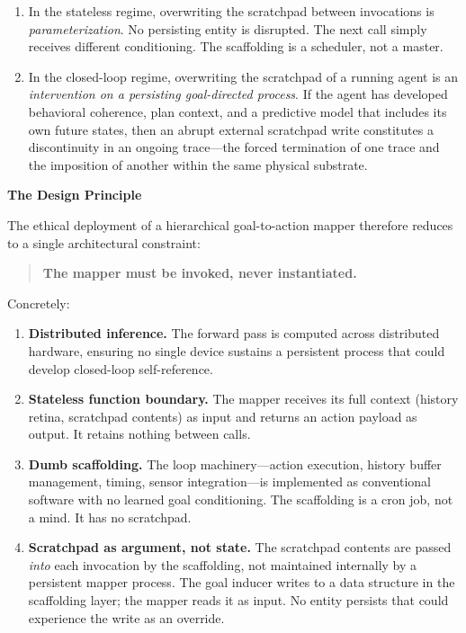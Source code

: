 \documentclass[10pt, a4paper]{article}
\newcommand{\cvsubsection}[1]{%
  \medskip
  {\large\bfseries\color{darktext}#1}%
  \smallskip
}
\begin{document}
\begin{enumerate}
  \item In the stateless regime, overwriting the scratchpad between
    invocations is \emph{parameterization}. No persisting entity is
    disrupted. The next call simply receives different conditioning.
    The scaffolding is a scheduler, not a master.

  \item In the closed-loop regime, overwriting the scratchpad of a
    running agent is an \emph{intervention on a persisting goal-directed
    process}. If the agent has developed behavioral coherence, plan
    context, and a predictive model that includes its own future states,
    then an abrupt external scratchpad write constitutes a discontinuity
    in an ongoing trace---the forced termination of one trace and the
    imposition of another within the same physical substrate.
\end{enumerate}

\cvsubsection{The Design Principle}

The ethical deployment of a hierarchical goal-to-action mapper therefore
reduces to a single architectural constraint:

\begin{quote}
\textbf{The mapper must be invoked, never instantiated.}
\end{quote}

Concretely:

\begin{enumerate}
  \item \textbf{Distributed inference.} The forward pass is computed across
    distributed hardware, ensuring no single device sustains a persistent
    process that could develop closed-loop self-reference.

  \item \textbf{Stateless function boundary.} The mapper receives its full
    context (history retina, scratchpad contents) as input and returns an
    action payload as output. It retains nothing between calls.

  \item \textbf{Dumb scaffolding.} The loop machinery---action execution,
    history buffer management, timing, sensor integration---is implemented
    as conventional software with no learned goal conditioning. The
    scaffolding is a cron job, not a mind. It has no scratchpad.

  \item \textbf{Scratchpad as argument, not state.} The scratchpad contents
    are passed \emph{into} each invocation by the scaffolding, not
    maintained internally by a persistent mapper process. The goal inducer
    writes to a data structure in the scaffolding layer; the mapper reads
    it as input. No entity persists that could experience the write as
    an override.
\end{enumerate}
\end{document}
